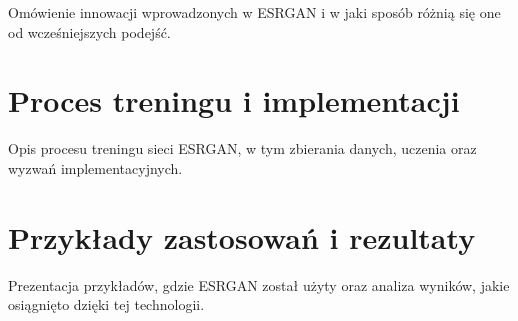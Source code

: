 

Omówienie innowacji wprowadzonych w ESRGAN i w jaki sposób różnią się one od wcześniejszych podejść.



\section{Proces treningu i implementacji}


Opis procesu treningu sieci ESRGAN, w tym zbierania danych, uczenia oraz wyzwań implementacyjnych.



\section{Przykłady zastosowań i rezultaty}


Prezentacja przykładów, gdzie ESRGAN został użyty oraz analiza wyników, jakie osiągnięto dzięki tej technologii.